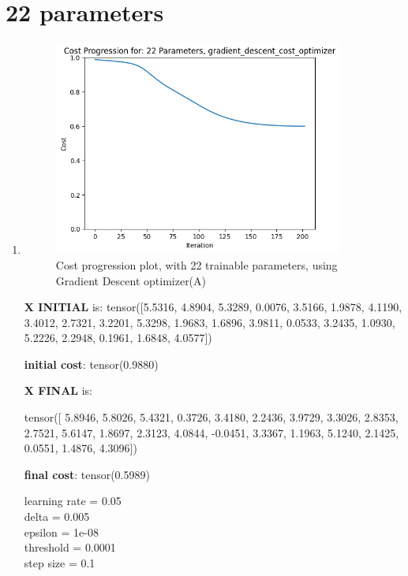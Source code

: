\documentclass[inscr,ack,preface]{diphdthesis}
\begin{document}
\section{22 parameters}

\begin{enumerate}[label=\textbf{\Alph*.}]
    \item \textbf{ }

    \begin{figure}[H]
        \centering
        \includegraphics[width=0.9\textwidth]{22.png}
        \caption{Cost progression plot, with 22 trainable parameters, using Gradient Descent optimizer(A)} 
        \label{fig:fig1}
    \end{figure}

    \textbf{X INITIAL} is:
    tensor([5.5316, 4.8904, 5.3289, 0.0076, 3.5166, 1.9878, 4.1190, 3.4012, 2.7321,
            3.2201, 5.3298, 1.9683, 1.6896, 3.9811, 0.0533, 3.2435, 1.0930, 5.2226,
            2.2948, 0.1961, 1.6848, 4.0577])
            
    \textbf{initial cost}: tensor(0.9880)
    
    \textbf{X FINAL} is:
    
    tensor([ 5.8946,  5.8026,  5.4321,  0.3726,  3.4180,  2.2436,  3.9729,  3.3026,
             2.8353,  2.7521,  5.6147,  1.8697,  2.3123,  4.0844, -0.0451,  3.3367,
             1.1963,  5.1240,  2.1425,  0.0551,  1.4876,  4.3096])
    
    \textbf{final cost}: tensor(0.5989)
    
    learning rate =  0.05 \\
    delta =  0.005 \\
    epsilon =  1e-08 \\
    threshold =  0.0001\\
    step size =  0.1 \\
    

\end{enumerate}
\end{document}
